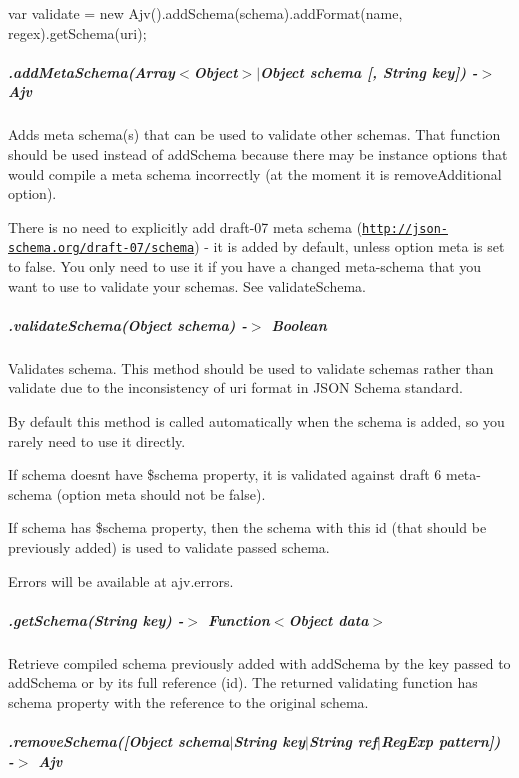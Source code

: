 \begin{DoxyCode}
var validate = new Ajv().addSchema(schema).addFormat(name, regex).getSchema(uri);
\end{DoxyCode}


\subparagraph*{.add\+Meta\+Schema(Array$<$Object$>$$\vert$\+Object schema \mbox{[}, String key\mbox{]}) -\/$>$ Ajv}

Adds meta schema(s) that can be used to validate other schemas. That function should be used instead of {\ttfamily add\+Schema} because there may be instance options that would compile a meta schema incorrectly (at the moment it is {\ttfamily remove\+Additional} option).

There is no need to explicitly add draft-\/07 meta schema (\href{http://json-schema.org/draft-07/schema}{\tt http\+://json-\/schema.\+org/draft-\/07/schema}) -\/ it is added by default, unless option {\ttfamily meta} is set to {\ttfamily false}. You only need to use it if you have a changed meta-\/schema that you want to use to validate your schemas. See {\ttfamily validate\+Schema}.

\subparagraph*{\label{_api-validateschema}%
.validate\+Schema(\+Object schema) -\/$>$ Boolean}

Validates schema. This method should be used to validate schemas rather than {\ttfamily validate} due to the inconsistency of {\ttfamily uri} format in J\+S\+ON Schema standard.

By default this method is called automatically when the schema is added, so you rarely need to use it directly.

If schema doesn\textquotesingle{}t have {\ttfamily \$schema} property, it is validated against draft 6 meta-\/schema (option {\ttfamily meta} should not be false).

If schema has {\ttfamily \$schema} property, then the schema with this id (that should be previously added) is used to validate passed schema.

Errors will be available at {\ttfamily ajv.\+errors}.

\subparagraph*{.get\+Schema(\+String key) -\/$>$ Function$<$Object data$>$}

Retrieve compiled schema previously added with {\ttfamily add\+Schema} by the key passed to {\ttfamily add\+Schema} or by its full reference (id). The returned validating function has {\ttfamily schema} property with the reference to the original schema.

\subparagraph*{.remove\+Schema(\mbox{[}Object schema$\vert$\+String key$\vert$\+String ref$\vert$\+Reg\+Exp pattern\mbox{]}) -\/$>$ Ajv}

